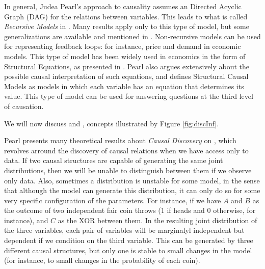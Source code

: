 In general, Judea Pearl's approach to causality assumes an Directed Acyclic Graph (DAG) for the relations between variables. This leads to what is called \emph{Recursive Models} in \cite{Causality}. Many results apply only to this type of model, but some generalizations are available and mentioned in \cite{Causality}. Non-recursive models can be used for representing feedback loops: for instance, price and demand in economic models. This type of model has been widely used in economics in the form of Structural Equations, as presented in \cite[Subsection~1.4.1]{Causality}. Pearl also argues extensively about the possible causal interpretation of such equations, and defines Structural Causal Models as models in which each variable has an equation that determines its value. This type of model can be used for answering questions at the third level of causation.

We will now discuss  and , concepts illustrated by Figure \ref{fig:discInf}.

Pearl presents many theoretical results about \emph{Causal Discovery} on \cite[Chapter~2]{Causality}, which revolves arround the discovery of causal relations when we have access only to data. If two causal structures are capable of generating the same joint distributions, then we will be unable to distinguish between them if we observe only data. Also, sometimes a distribution is unstable for some model, in the sense that although the model can generate this distribution, it can only do so for some very specific configuration of the parameters. For instance, if we have $A$ and $B$ as the outcome of two independent fair coin throws ($1$ if heads and $0$ otherwise, for instance), and $C$ as the XOR between them. In the resulting joint distribution of the three variables, each pair of variables will be marginalyl independent but dependent if we condition on the third variable. This can be generated by three different causal structures, but only one is stable to small changes in the model (for instance, to small changes in the probability of each coin). 

